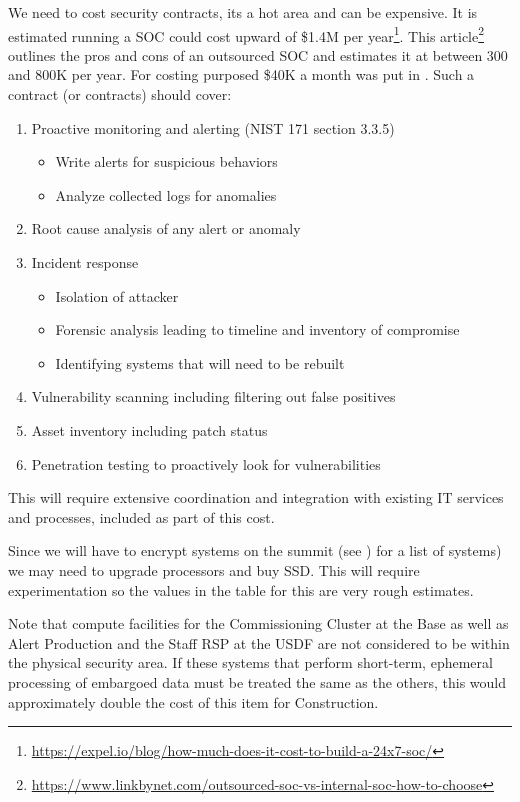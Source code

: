 



We need to cost security contracts, its a hot area and can be expensive.
It is estimated running a SOC could cost upward of \$1.4M per year\footnote{\url{https://expel.io/blog/how-much-does-it-cost-to-build-a-24x7-soc/}}.
This article\footnote{\url{https://www.linkbynet.com/outsourced-soc-vs-internal-soc-how-to-choose}} outlines the pros and cons of
an outsourced SOC and estimates it at between 300 and 800K per year.
For costing purposed  \$40K a month was put in .
Such a contract (or contracts) should cover:

\begin{enumerate}
\item Proactive monitoring and alerting (NIST 171 section 3.3.5)
  \begin{itemize}
  \item Write alerts for suspicious behaviors
  \item Analyze collected logs for anomalies
  \end{itemize}
\item Root cause analysis of any alert or anomaly
\item Incident response
  \begin{itemize}
  \item Isolation of attacker
  \item Forensic analysis leading to timeline and inventory of compromise
  \item Identifying systems that will need to be rebuilt
  \end{itemize}
\item Vulnerability scanning including filtering out false positives
\item Asset inventory including patch status
\item Penetration testing to proactively look for vulnerabilities
\end{enumerate}

This will require extensive coordination and integration with existing IT
services and processes, included as part of this cost.

Since we will have to encrypt systems on the summit (see ) for a list of systems)
we may need to upgrade processors and buy SSD. This will require experimentation so the
values in the table for this are very rough estimates.

Note that compute facilities for the Commissioning Cluster at the Base as well as Alert Production and the Staff RSP at the USDF are not considered to be within the physical security area.
If these systems that perform short-term, ephemeral processing of embargoed data must be treated the same as the others, this would approximately double the cost of this item for Construction.

